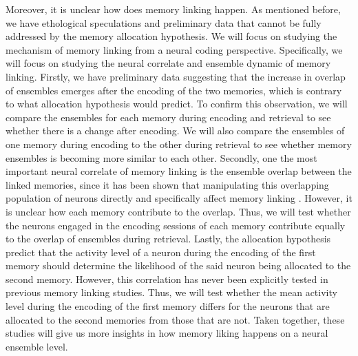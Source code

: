 \documentclass[master.tex]{subfiles}
\begin{document}
Moreover, it is unclear how does memory linking happen. As mentioned before, we
have ethological speculations and preliminary data that cannot be fully
addressed by the memory allocation hypothesis. We will focus on studying the
mechanism of memory linking from a neural coding perspective. Specifically, we
will focus on studying the neural correlate and ensemble dynamic of memory
linking. Firstly, we have preliminary data suggesting that the increase in
overlap of ensembles emerges after the encoding of the two memories, which is
contrary to what allocation hypothesis would predict. To confirm this
observation, we will compare the ensembles for each memory during encoding and
retrieval to see whether there is a change after encoding. We will also compare
the ensembles of one memory during encoding to the other during retrieval to see
whether memory ensembles is becoming more similar to each other. Secondly, one
the most important neural correlate of memory linking is the ensemble overlap
between the linked memories, since it has been shown that manipulating this
overlapping population of neurons directly and specifically affect memory
linking \cite{yokose_overlapping_2017}. However, it is unclear how each memory
contribute to the overlap. Thus, we will test whether the neurons engaged in the
encoding sessions of each memory contribute equally to the overlap of ensembles
during retrieval. Lastly, the allocation hypothesis predict that the activity
level of a neuron during the encoding of the first memory should determine the
likelihood of the said neuron being allocated to the second memory. However,
this correlation has never been explicitly tested in previous memory linking
studies. Thus, we will test whether the mean activity level during the encoding
of the first memory differs for the neurons that are allocated to the second
memories from those that are not. Taken together, these studies will give us
more insights in how memory liking happens on a neural ensemble level.
\end{document}
